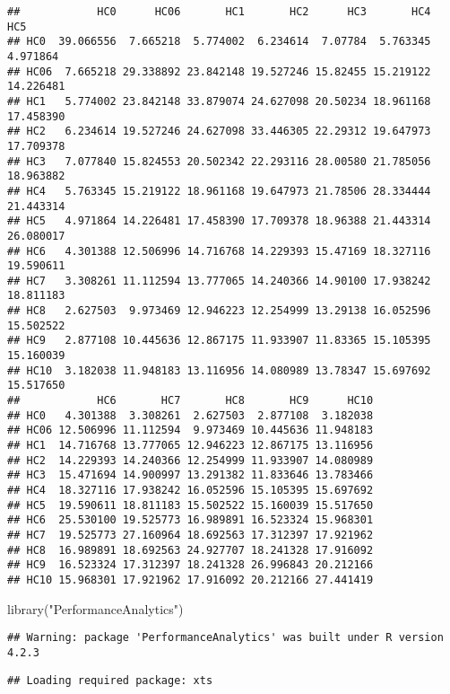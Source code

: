 \documentclass[
]{article}
\newenvironment{Shaded}{\begin{snugshade}}{\end{snugshade}}
\newcommand{\FunctionTok}[1]{\textcolor[rgb]{0.00,0.00,0.00}{#1}}
\newcommand{\NormalTok}[1]{#1}
\newcommand{\StringTok}[1]{\textcolor[rgb]{0.31,0.60,0.02}{#1}}
\begin{document}
\begin{verbatim}
##            HC0      HC06       HC1       HC2      HC3       HC4       HC5
## HC0  39.066556  7.665218  5.774002  6.234614  7.07784  5.763345  4.971864
## HC06  7.665218 29.338892 23.842148 19.527246 15.82455 15.219122 14.226481
## HC1   5.774002 23.842148 33.879074 24.627098 20.50234 18.961168 17.458390
## HC2   6.234614 19.527246 24.627098 33.446305 22.29312 19.647973 17.709378
## HC3   7.077840 15.824553 20.502342 22.293116 28.00580 21.785056 18.963882
## HC4   5.763345 15.219122 18.961168 19.647973 21.78506 28.334444 21.443314
## HC5   4.971864 14.226481 17.458390 17.709378 18.96388 21.443314 26.080017
## HC6   4.301388 12.506996 14.716768 14.229393 15.47169 18.327116 19.590611
## HC7   3.308261 11.112594 13.777065 14.240366 14.90100 17.938242 18.811183
## HC8   2.627503  9.973469 12.946223 12.254999 13.29138 16.052596 15.502522
## HC9   2.877108 10.445636 12.867175 11.933907 11.83365 15.105395 15.160039
## HC10  3.182038 11.948183 13.116956 14.080989 13.78347 15.697692 15.517650
##            HC6       HC7       HC8       HC9      HC10
## HC0   4.301388  3.308261  2.627503  2.877108  3.182038
## HC06 12.506996 11.112594  9.973469 10.445636 11.948183
## HC1  14.716768 13.777065 12.946223 12.867175 13.116956
## HC2  14.229393 14.240366 12.254999 11.933907 14.080989
## HC3  15.471694 14.900997 13.291382 11.833646 13.783466
## HC4  18.327116 17.938242 16.052596 15.105395 15.697692
## HC5  19.590611 18.811183 15.502522 15.160039 15.517650
## HC6  25.530100 19.525773 16.989891 16.523324 15.968301
## HC7  19.525773 27.160964 18.692563 17.312397 17.921962
## HC8  16.989891 18.692563 24.927707 18.241328 17.916092
## HC9  16.523324 17.312397 18.241328 26.996843 20.212166
## HC10 15.968301 17.921962 17.916092 20.212166 27.441419
\end{verbatim}

\begin{Shaded}
\begin{Highlighting}[]
\FunctionTok{library}\NormalTok{(}\StringTok{"PerformanceAnalytics"}\NormalTok{)}
\end{Highlighting}
\end{Shaded}

\begin{verbatim}
## Warning: package 'PerformanceAnalytics' was built under R version 4.2.3
\end{verbatim}

\begin{verbatim}
## Loading required package: xts
\end{verbatim}
\end{document}
